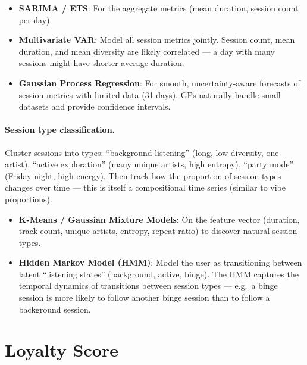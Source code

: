 \documentclass[12pt, a4paper]{article}
\begin{document}
\begin{itemize}
    \item \textbf{SARIMA / ETS}: For the aggregate metrics (mean duration,
          session count per day).
    \item \textbf{Multivariate VAR}: Model all session metrics jointly.
          Session count, mean duration, and mean diversity are likely
          correlated --- a day with many sessions might have shorter average
          duration.
    \item \textbf{Gaussian Process Regression}: For smooth, uncertainty-aware
          forecasts of session metrics with limited data (31 days). GPs
          naturally handle small datasets and provide confidence intervals.
\end{itemize}

\paragraph{Session type classification.}
Cluster sessions into types: ``background listening'' (long, low diversity,
one artist), ``active exploration'' (many unique artists, high entropy),
``party mode'' (Friday night, high energy). Then track how the proportion
of session types changes over time --- this is itself a compositional
time series (similar to vibe proportions).

\begin{itemize}
    \item \textbf{K-Means / Gaussian Mixture Models}: On the feature vector
          (duration, track count, unique artists, entropy, repeat ratio) to
          discover natural session types.
    \item \textbf{Hidden Markov Model (HMM)}: Model the user as transitioning
          between latent ``listening states'' (background, active, binge).
          The HMM captures the temporal dynamics of transitions between
          session types --- e.g.\ a binge session is more likely to follow
          another binge session than to follow a background session.
\end{itemize}

\section{Loyalty Score}
\end{document}
